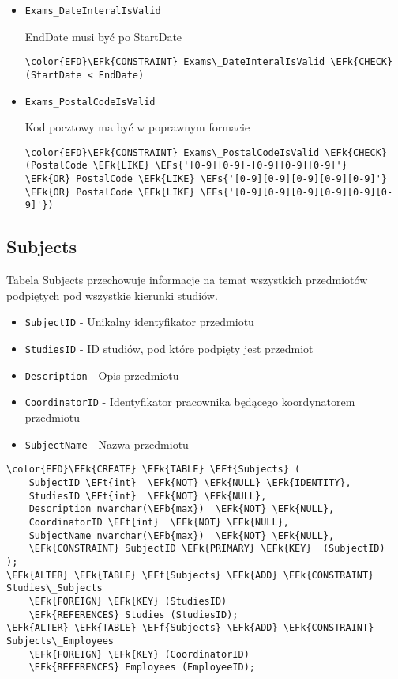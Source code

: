 \documentclass[11pt]{article}
\newcommand{\EFs}[1]{\textcolor{EFs}{#1}} %
\newcommand{\EFk}[1]{\textcolor{EFk}{\textbf{#1}}} %
\newcommand{\EFb}[1]{\textcolor{EFb}{\textbf{#1}}} %
\newcommand{\EFf}[1]{\textcolor{EFf}{#1}} %
\newcommand{\EFt}[1]{\textcolor{EFt}{\textbf{#1}}} %
\begin{document}
\begin{itemize}
\item \texttt{Exams\_DateInteralIsValid}

EndDate musi być po StartDate
\begin{Code}
\begin{Verbatim}
\color{EFD}\EFk{CONSTRAINT} Exams\_DateInteralIsValid \EFk{CHECK}
(StartDate < EndDate)
\end{Verbatim}
\end{Code}
\item \texttt{Exams\_PostalCodeIsValid}

Kod pocztowy ma być w poprawnym formacie
\begin{Code}
\begin{Verbatim}
\color{EFD}\EFk{CONSTRAINT} Exams\_PostalCodeIsValid \EFk{CHECK}
(PostalCode \EFk{LIKE} \EFs{'[0-9][0-9]-[0-9][0-9][0-9]'}
\EFk{OR} PostalCode \EFk{LIKE} \EFs{'[0-9][0-9][0-9][0-9][0-9]'}
\EFk{OR} PostalCode \EFk{LIKE} \EFs{'[0-9][0-9][0-9][0-9][0-9][0-9]'})
\end{Verbatim}
\end{Code}
\end{itemize}
\subsection{Subjects}
\label{sec:orgb69c5ae}
Tabela Subjects przechowuje informacje na temat wszystkich przedmiotów podpiętych pod wszystkie kierunki studiów.
\begin{itemize}
\item \texttt{SubjectID} - Unikalny identyfikator przedmiotu
\item \texttt{StudiesID} - ID studiów, pod które podpięty jest przedmiot
\item \texttt{Description} - Opis przedmiotu
\item \texttt{CoordinatorID} - Identyfikator pracownika będącego koordynatorem przedmiotu
\item \texttt{SubjectName} - Nazwa przedmiotu
\end{itemize}
\begin{Code}
\begin{Verbatim}
\color{EFD}\EFk{CREATE} \EFk{TABLE} \EFf{Subjects} (
    SubjectID \EFt{int}  \EFk{NOT} \EFk{NULL} \EFk{IDENTITY},
    StudiesID \EFt{int}  \EFk{NOT} \EFk{NULL},
    Description nvarchar(\EFb{max})  \EFk{NOT} \EFk{NULL},
    CoordinatorID \EFt{int}  \EFk{NOT} \EFk{NULL},
    SubjectName nvarchar(\EFb{max})  \EFk{NOT} \EFk{NULL},
    \EFk{CONSTRAINT} SubjectID \EFk{PRIMARY} \EFk{KEY}  (SubjectID)
);
\EFk{ALTER} \EFk{TABLE} \EFf{Subjects} \EFk{ADD} \EFk{CONSTRAINT} Studies\_Subjects
    \EFk{FOREIGN} \EFk{KEY} (StudiesID)
    \EFk{REFERENCES} Studies (StudiesID);
\EFk{ALTER} \EFk{TABLE} \EFf{Subjects} \EFk{ADD} \EFk{CONSTRAINT} Subjects\_Employees
    \EFk{FOREIGN} \EFk{KEY} (CoordinatorID)
    \EFk{REFERENCES} Employees (EmployeeID);
\end{Verbatim}
\end{Code}
\end{document}
